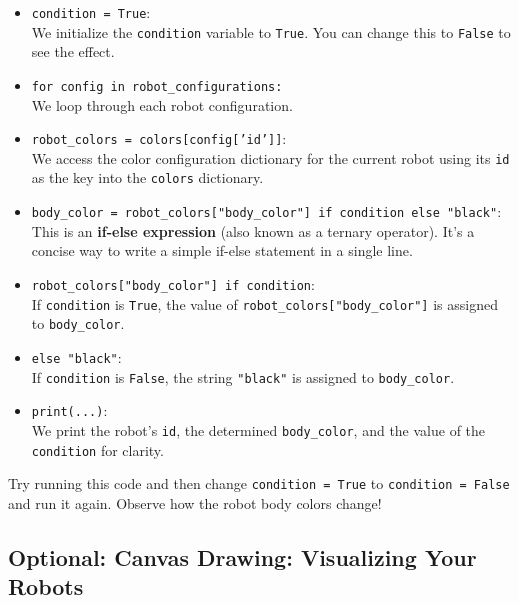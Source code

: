 \begin{itemize}
    \setlength{\itemsep}{0pt}
    \setlength{\parskip}{0pt}
    \item \texttt{condition = True}:\\
    We initialize the \texttt{condition} variable to \texttt{True}. You can change this to \texttt{False} to see the effect.\\
    \item \texttt{for config in robot\_configurations:}\\
    We loop through each robot configuration.\\
    \item \texttt{robot\_colors = colors[config['id']]}:\\
    We access the color configuration dictionary for the current robot using its \texttt{id} as the key into the \texttt{colors} dictionary.\\
    \item \texttt{body\_color = robot\_colors["body\_color"] if condition else "black"}:\\
    This is an \textbf{if-else expression} (also known as a ternary operator). It's a concise way to write a simple if-else statement in a single line.\\
    \item \texttt{robot\_colors["body\_color"] if condition}:\\
    If \texttt{condition} is \texttt{True}, the value of \texttt{robot\_colors["body\_color"]} is assigned to \texttt{body\_color}.\\
    \item \texttt{else "black"}:\\
    If \texttt{condition} is \texttt{False}, the string \texttt{"black"} is assigned to \texttt{body\_color}.\\
    \item \texttt{print(...)}:\\
    We print the robot's \texttt{id}, the determined \texttt{body\_color}, and the value of the \texttt{condition} for clarity.\\
\end{itemize}

Try running this code and then change \texttt{condition = True} to \texttt{condition = False} and run it again. Observe how the robot body colors change!



\newpage
\subsection{Optional: Canvas Drawing: Visualizing Your Robots}

